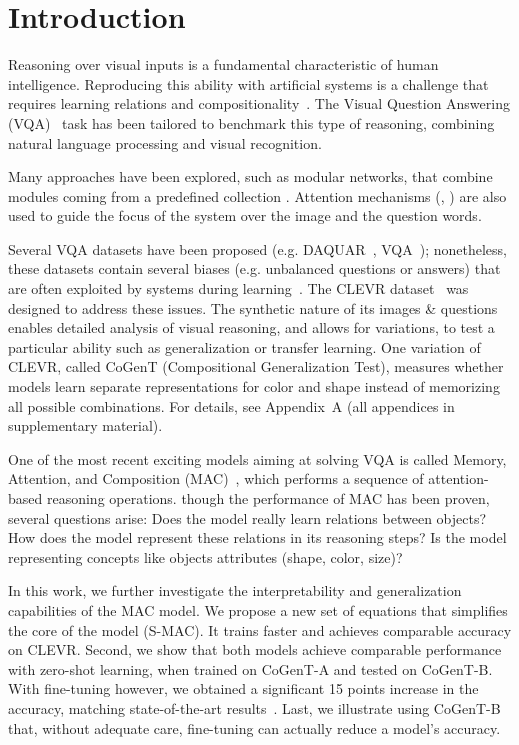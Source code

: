\section{Introduction}
Reasoning over visual inputs is a fundamental characteristic of human intelligence.
Reproducing this ability with artificial systems is a challenge that requires learning relations and compositionality~\cite{hu2017learning, johnson2017inferring}. The Visual Question Answering (VQA)~\cite{antol2015vqa,malinowski2014towards,wu2017visual} task has been tailored to benchmark this type of reasoning, combining natural language processing and visual recognition.

Many approaches have been explored, such as modular networks, that combine modules coming from a predefined collection \cite{andreas2016learning,johnson2017inferring, mascharka2018transparency}. Attention mechanisms (\cite{bahdanau2014neural}, \cite{xu2015show}) are also used to guide the focus of the system over the image and the question words.

Several VQA datasets have been proposed (e.g. DAQUAR~\cite{malinowski2014multi}, VQA~\cite{antol2015vqa}); nonetheless, these datasets contain several biases (e.g. unbalanced questions or answers) that are often exploited by systems during learning~\cite{goyal2017making}.
The CLEVR dataset~\cite{johnson2017clevr} was designed to address these issues. The synthetic nature of its images \& questions enables detailed analysis of visual reasoning, and allows for variations, to test a particular ability such as generalization or transfer learning. One variation of CLEVR, called CoGenT (Compositional Generalization Test), measures whether models learn separate representations for color and shape instead of memorizing all possible combinations. 
For details, see Appendix~A (all appendices in supplementary material).


One of the most recent exciting models aiming at solving VQA is called Memory, Attention, and Composition (MAC)~\cite{hudson2018compositional}, which performs a sequence of attention-based reasoning operations. 
though the performance of MAC has been proven, several questions arise:
Does the model really learn relations between objects? 
How does the model represent these relations in its reasoning steps? 
Is the model representing concepts like objects attributes (shape, color, size)?

In this work, we further investigate the interpretability and generalization capabilities of the MAC model.
We propose a new set of equations that simplifies the core of the model (S-MAC). It trains faster and achieves comparable accuracy on CLEVR. 
Second, we show that both models achieve comparable performance with zero-shot learning, when trained on CoGenT-A and tested on CoGenT-B. With fine-tuning however, we obtained a significant 15 points increase in the accuracy, matching state-of-the-art results~\cite{perez2017film, mascharka2018transparency}.
Last, we illustrate using CoGenT-B that, without adequate care, fine-tuning can actually reduce a model's accuracy.